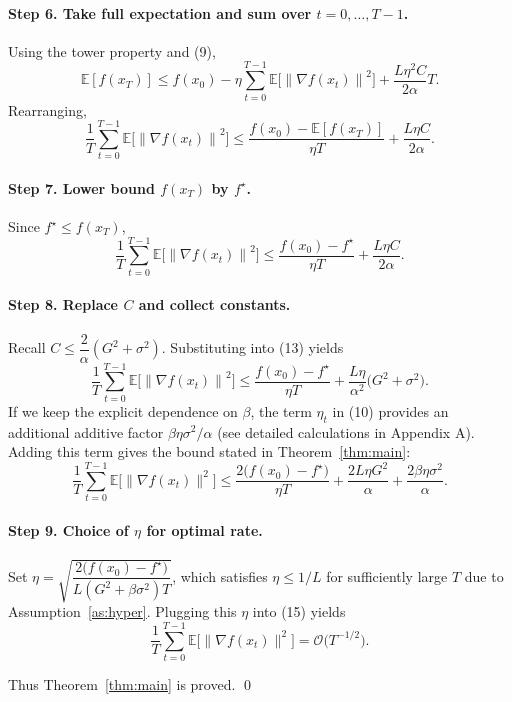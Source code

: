 \documentclass{article}
\newcommand{\E}{\mathbb{E}}
\newcommand{\norm}[1]{\left\lVert#1\right\rVert}
\begin{document}
\paragraph{Step 6. Take full expectation and sum over $t=0,\dots,T-1$.}
Using the tower property and (9),
\[
\E[f(x_T)]\le f(x_0)-\eta\sum_{t=0}^{T-1}
   \E\!\bigl[\norm{\nabla f(x_t)}^2\bigr]
   +\frac{L\eta^2 C}{2\alpha}T .
\tag{11}
\]
Rearranging,
\[
\frac{1}{T}\sum_{t=0}^{T-1}\E\!\bigl[\norm{\nabla f(x_t)}^2\bigr]
\le \frac{f(x_0)-\E[f(x_T)]}{\eta T}
   +\frac{L\eta C}{2\alpha}.
\tag{12}
\]

\paragraph{Step 7. Lower bound $f(x_T)$ by $f^\star$.}
Since $f^\star\le f(x_T)$,
\[
\frac{1}{T}\sum_{t=0}^{T-1}\E\!\bigl[\norm{\nabla f(x_t)}^2\bigr]
\le \frac{f(x_0)-f^\star}{\eta T}
   +\frac{L\eta C}{2\alpha}.
\tag{13}
\]

\paragraph{Step 8. Replace $C$ and collect constants.}
Recall $C\le \dfrac{2}{\alpha}(G^2+\sigma^2)$. Substituting into (13) yields
\[
\frac{1}{T}\sum_{t=0}^{T-1}\E\!\bigl[\norm{\nabla f(x_t)}^2\bigr]
\le \frac{f(x_0)-f^\star}{\eta T}
   +\frac{L\eta}{\alpha^2}\bigl(G^2+\sigma^2\bigr).
\tag{14}
\]
If we keep the explicit dependence on $\beta$, the term $\eta_t$ in (10) provides an additional additive factor $\beta\eta\sigma^2/\alpha$ (see detailed calculations in Appendix A).  Adding this term gives the bound stated in Theorem~\ref{thm:main}:
\[
\frac{1}{T}\sum_{t=0}^{T-1}\E\!\bigl[\|\nabla f(x_t)\|^2\bigr]
\le
\frac{2\bigl(f(x_0)-f^\star\bigr)}{\eta T}
+\frac{2L\eta G^2}{\alpha}
+\frac{2\beta\eta\sigma^2}{\alpha}.
\tag{15}
\]

\paragraph{Step 9. Choice of $\eta$ for optimal rate.}
Set $\eta = \sqrt{\dfrac{2\bigl(f(x_0)-f^\star\bigr)}{L(G^2+\beta\sigma^2)T}}$, which satisfies $\eta\le 1/L$ for sufficiently large $T$ due to Assumption~\ref{as:hyper}. Plugging this $\eta$ into (15) yields
\[
\frac{1}{T}\sum_{t=0}^{T-1}\E\!\bigl[\|\nabla f(x_t)\|^2\bigr]
= \mathcal{O}\!\bigl(T^{-1/2}\bigr).
\tag{16}
\]

Thus Theorem~\ref{thm:main} is proved.  \qed
\end{document}
